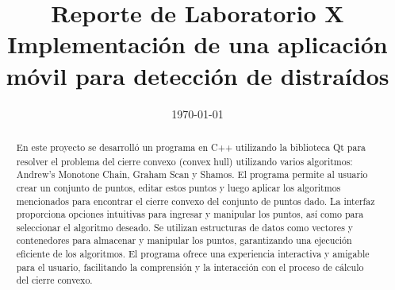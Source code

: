 \documentclass[conference]{IEEEtran}
\date{\specialdate\today}
\begin{document}
%
%
%

\newcommand{\breite}{0.9} %
\newcommand{\RelacionFiguradoscolumnas}{0.9}
\newcommand{\RelacionFiguradoscolumnasPuntoCinco}{0.45}




\title{Reporte de Laboratorio X \\ Implementación de una aplicación móvil para detección de distraídos}

\author{
}



\maketitle

\begin{abstract} 
\textbf{} En este proyecto se desarrolló un programa en C++ utilizando la biblioteca Qt para resolver el problema del cierre convexo (convex hull) utilizando varios algoritmos: Andrew's Monotone Chain, Graham Scan y Shamos. El programa permite al usuario crear un conjunto de puntos, editar estos puntos y luego aplicar los algoritmos mencionados para encontrar el cierre convexo del conjunto de puntos dado. La interfaz proporciona opciones intuitivas para ingresar y manipular los puntos, así como para seleccionar el algoritmo deseado. Se utilizan estructuras de datos como vectores y contenedores para almacenar y manipular los puntos, garantizando una ejecución eficiente de los algoritmos. El programa ofrece una experiencia interactiva y amigable para el usuario, facilitando la comprensión y la interacción con el proceso de cálculo del cierre convexo.
\end{abstract}
\end{document}

